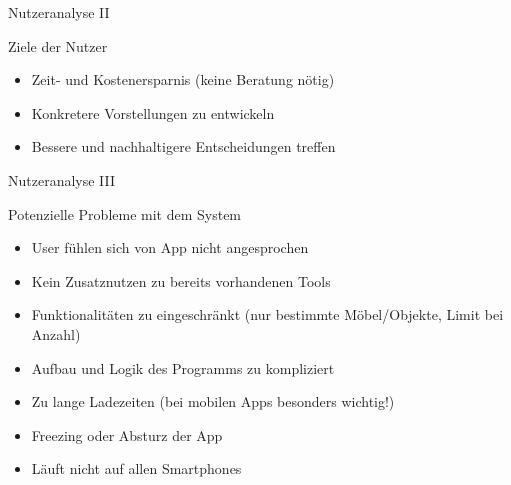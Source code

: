 \documentclass[presentation,bigger,aspectratio=169]{beamer}
\begin{document}
\begin{frame}[label={sec:orge41dd1f}]{Nutzeranalyse II}
\begin{block}{Ziele der Nutzer}
\begin{itemize}
\item Zeit- und Kostenersparnis (keine Beratung nötig)
\item Konkretere Vorstellungen zu entwickeln
\item Bessere und nachhaltigere Entscheidungen treffen
\end{itemize}
\end{block}
\end{frame}

\begin{frame}[label={sec:org5a17150}]{Nutzeranalyse III}
\begin{block}{Potenzielle Probleme mit dem System}
\begin{itemize}
\item User fühlen sich von App nicht angesprochen
\item Kein Zusatznutzen zu bereits vorhandenen Tools
\item Funktionalitäten zu eingeschränkt (nur bestimmte Möbel/Objekte,
Limit bei Anzahl)
\item Aufbau und Logik des Programms zu kompliziert
\item Zu lange Ladezeiten (bei mobilen Apps besonders wichtig!)
\item Freezing oder Absturz der App
\item Läuft nicht auf allen Smartphones
\end{itemize}
\end{block}
\end{frame}
\end{document}
